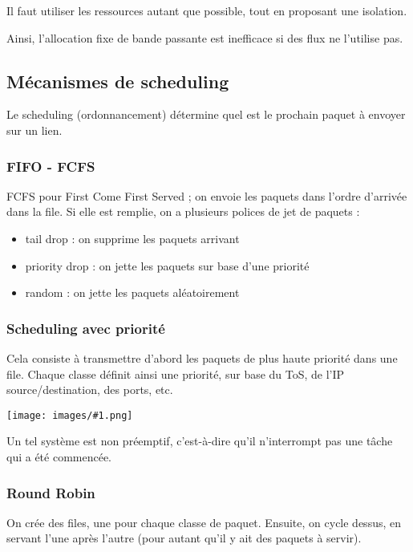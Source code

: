 \documentclass[10pt,a4paper]{report}
\newcommand{\dessinS}[2]{\begin{center}\texttt{[image: images/\#1.png]}\end{center}}
\begin{document}
		Il faut utiliser les ressources autant que possible, tout en proposant une isolation.
		
		Ainsi, l'allocation fixe de bande passante est inefficace si des flux ne l'utilise pas.
		
		
		\subsection{Mécanismes de scheduling}
		
		Le scheduling (ordonnancement) détermine quel est le prochain paquet à envoyer sur un lien.
		
			\subsubsection{FIFO - FCFS}
			
			FCFS pour First Come First Served ; on envoie les paquets dans l'ordre d'arrivée dans la file. Si elle est remplie, on a plusieurs polices de jet de paquets :
			
			\begin{itemize}
				\item tail drop : on supprime les paquets arrivant
				\item priority drop : on jette les paquets sur base d'une priorité
				\item random : on jette les paquets aléatoirement
			\end{itemize}
			
			\subsubsection{Scheduling avec priorité}
			
			Cela consiste à transmettre d'abord les paquets de plus haute priorité dans une file. Chaque classe définit ainsi une priorité, sur base du ToS, de l'IP source/destination, des ports, etc.
			
			\dessinS{92}{.8}
			
			Un tel système est non préemptif, c'est-à-dire qu'il n'interrompt pas une tâche qui a été commencée.
			
			\subsubsection{Round Robin}

			On crée des files, une pour chaque classe de paquet. Ensuite, on cycle dessus, en servant l'une après l'autre (pour autant qu'il y ait des paquets à servir).
\end{document}
